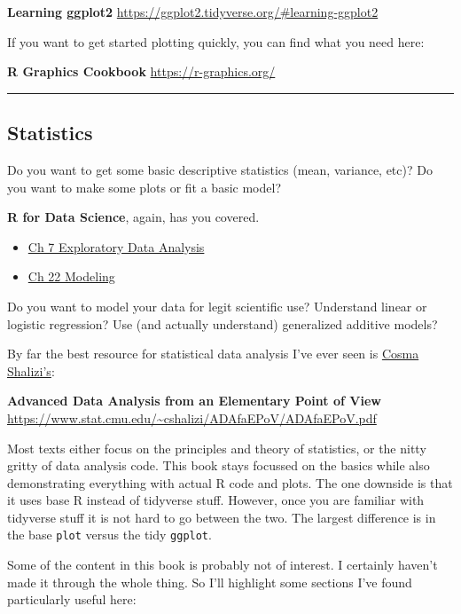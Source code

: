 \documentclass[
]{article}
\providecommand{\tightlist}{%
  \setlength{\itemsep}{0pt}\setlength{\parskip}{0pt}}
\begin{document}
\textbf{Learning ggplot2}
\url{https://ggplot2.tidyverse.org/\#learning-ggplot2}

If you want to get started plotting quickly, you can find what you need
here:

\textbf{R Graphics Cookbook} \url{https://r-graphics.org/}

\begin{center}\rule{0.5\linewidth}{0.5pt}\end{center}

\hypertarget{statistics}{%
\subsection{Statistics}\label{statistics}}

Do you want to get some basic descriptive statistics (mean, variance,
etc)? Do you want to make some plots or fit a basic model?

\textbf{R for Data Science}, again, has you covered.

\begin{itemize}
\tightlist
\item
  \href{https://r4ds.had.co.nz/exploratory-data-analysis.html}{Ch 7
  Exploratory Data Analysis}
\item
  \href{https://r4ds.had.co.nz/model-intro.html}{Ch 22 Modeling}
\end{itemize}

Do you want to model your data for legit scientific use? Understand
linear or logistic regression? Use (and actually understand) generalized
additive models?

By far the best resource for statistical data analysis I've ever seen is
\href{http://bactra.org/}{Cosma Shalizi's}:

\textbf{Advanced Data Analysis from an Elementary Point of View}
\url{https://www.stat.cmu.edu/~cshalizi/ADAfaEPoV/ADAfaEPoV.pdf}

Most texts either focus on the principles and theory of statistics, or
the nitty gritty of data analysis code. This book stays focussed on the
basics while also demonstrating everything with actual R code and plots.
The one downside is that it uses base R instead of tidyverse stuff.
However, once you are familiar with tidyverse stuff it is not hard to go
between the two. The largest difference is in the base \texttt{plot}
versus the tidy \texttt{ggplot}.

Some of the content in this book is probably not of interest. I
certainly haven't made it through the whole thing. So I'll highlight
some sections I've found particularly useful here:
\end{document}

